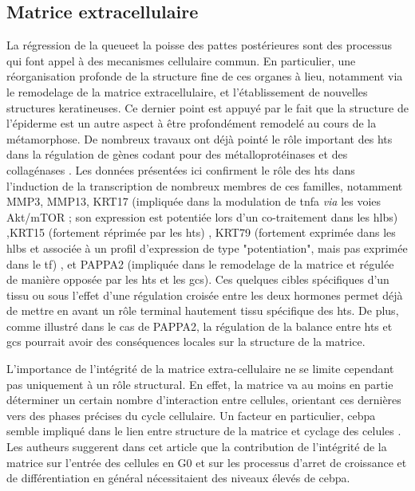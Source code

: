 \documentclass[../main.tex]{subfiles}
\begin{document}
\subsection{Matrice extracellulaire}
La régression de la queueet la poisse des pattes postérieures sont des processus qui font appel à des mecanismes cellulaire commun.
En particulier, une réorganisation profonde de la structure fine de ces organes à lieu, notamment via le remodelage de la matrice extracellulaire, et l'établissement de nouvelles structures keratineuses.
Ce dernier point est appuyé par le fait que la structure de l'épiderme est un autre aspect à être profondément remodelé au cours de la métamorphose.
De nombreux travaux ont déjà pointé le rôle important des \glspl{ht} dans la régulation de gènes codant pour des métalloprotéinases et des collagénases .
Les données présentées ici confirment le rôle des \glspl{ht} dans l'induction de la transcription de nombreux membres de ces familles, notamment MMP3, MMP13, KRT17 (impliquée dans la modulation de \gls{tnfa} \textit{via} les voies Akt/mTOR ; son expression est potentiée lors d'un co-traitement dans les \glspl{hlb})
,KRT15 (fortement réprimée par les \glspl{ht})
, KRT79 (fortement exprimée dans les \glspl{hlb} et associée à un profil d'expression de type "potentiation", mais pas exprimée dans le \gls{tf})
, et PAPPA2 (impliquée dans le remodelage de la matrice et régulée de manière opposée par les \glspl{ht} et les \glspl{gc}).
Ces quelques cibles spécifiques d'un tissu ou sous l'effet d'une régulation croisée entre les deux hormones permet déjà de mettre en avant un rôle terminal hautement tissu spécifique des \glspl{ht}.
De plus, comme illustré dans le cas de PAPPA2, la régulation de la balance entre \glspl{ht} et \glspl{gc} pourrait avoir des conséquences locales sur la structure de la matrice.
\par
L'importance de l'intégrité de la matrice extra-cellulaire ne se limite cependant pas uniquement à un rôle structural.
En effet, la matrice va au moins en partie déterminer un certain nombre d'interaction entre cellules, orientant ces dernières vers des phases précises du cycle cellulaire.
Un facteur en particulier, \gls{cebpa} semble impliqué dans le lien entre structure de la matrice et cyclage des celules \citep{Rana1994}.
Les autheurs suggerent dans cet article que la contribution de l'intégrité de la matrice sur l'entrée des cellules en G0 et sur les processus d'arret de croissance et de différentiation en général nécessitaient des niveaux élevés de \gls{cebpa}.
\end{document}
